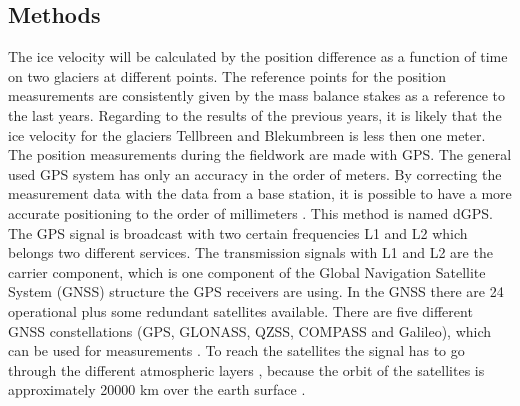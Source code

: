 \subsection{Methods}\label{GPS:subsec:methods}

The ice velocity will be calculated by the position difference as a function of time on two glaciers at different points.
The reference points for the position measurements are consistently given by the mass balance stakes as a reference to the last years.
Regarding to the results of the previous years, it is likely that the ice velocity for the glaciers Tellbreen and Blekumbreen is less then one meter.
The position measurements during the fieldwork are made with GPS. 
The general used GPS system has only an accuracy in the order of meters.
By correcting the measurement data with the data from a base station, it is possible to have a more accurate positioning to the order of millimeters \citep{UGPS}. This method is named dGPS.
\medskip
The GPS signal is broadcast with two certain frequencies L1 and L2 which belongs two different services.
The transmission signals with L1 and L2 are the carrier component, which is one component of the Global Navigation Satellite System (GNSS) structure the GPS receivers are using.
In the GNSS there are 24 operational plus some redundant satellites available.
There are five different GNSS constellations (GPS, GLONASS, QZSS, COMPASS and Galileo), which can be used for measurements \citep{Trprocess}.
To reach the satellites the signal has to go through the different atmospheric layers \citep{churcherdgps},
because the orbit of the satellites is approximately 20000 km over the earth surface \citep{Trprocess}.
\medskip

